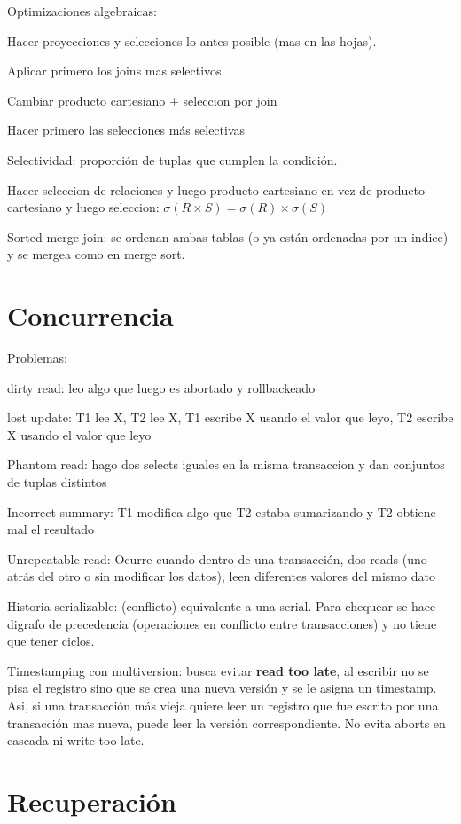 Optimizaciones algebraicas:

Hacer proyecciones y selecciones lo antes posible (mas en las hojas).

Aplicar primero los joins mas selectivos

Cambiar producto cartesiano + seleccion por join

Hacer primero las selecciones más selectivas

Selectividad: proporción de tuplas que cumplen la condición.

Hacer seleccion de relaciones y luego producto cartesiano en vez de producto cartesiano y luego seleccion: $\sigma(R \times S) = \sigma(R) \times \sigma(S)$

Sorted merge join: se ordenan ambas tablas (o ya están ordenadas por un indice) y se mergea como en merge sort.

\section{Concurrencia}

Problemas:

dirty read: leo algo que luego es abortado y rollbackeado

lost update: T1 lee X, T2 lee X, T1 escribe X usando el valor que leyo, T2 escribe X usando el valor que leyo

Phantom read: hago dos selects iguales en la misma transaccion y dan conjuntos de tuplas distintos

Incorrect summary: T1 modifica algo que T2 estaba sumarizando y T2 obtiene mal el resultado

Unrepeatable read: Ocurre cuando dentro de una transacción, dos reads (uno atrás del otro o
sin modificar los datos), leen diferentes valores del mismo dato

Historia serializable: (conflicto) equivalente a una serial. Para chequear se hace digrafo de precedencia (operaciones en conflicto entre transacciones) y no tiene que tener ciclos.

Timestamping con multiversion: busca evitar \textbf{read too late}, al escribir no se pisa el registro sino que se crea una nueva versión y se le asigna un timestamp. Asi, si una transacción más vieja quiere leer un registro que fue escrito por una transacción mas nueva, puede leer la versión correspondiente. No evita aborts en cascada ni write too late.

\section{Recuperación}


